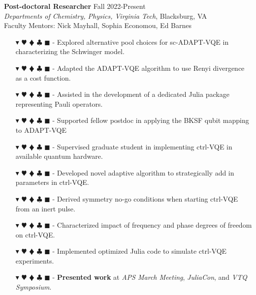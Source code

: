 \documentclass[overlapped, 10pt]{res} %
\newcommand{\physics}{$\blacktriangledown$}
\newcommand{\biochem}{$\varheartsuit$}
\newcommand{\shannon}{$\vardiamondsuit$}
\newcommand{\classic}{$\clubsuit$}
\newcommand{\quantum}{$\blacksquare$}
\newcommand{\physicscolor}{\color{YellowOrange}}
\newcommand{\biochemcolor}{\color{Emerald}}
\newcommand{\shannoncolor}{\color{Goldenrod}}
\newcommand{\classiccolor}{\color{Cyan}}
\newcommand{\quantumcolor}{\color{RedOrange}}
\newcommand{\tag}[1]{
    {\IfSubStr{#1}{\physics}{\physicscolor}{\color{White}}\physics}
    {\IfSubStr{#1}{\biochem}{\biochemcolor}{\color{White}}\biochem}
    {\IfSubStr{#1}{\shannon}{\shannoncolor}{\color{White}}\shannon}
    {\IfSubStr{#1}{\classic}{\classiccolor}{\color{White}}\classic}
    {\IfSubStr{#1}{\quantum}{\quantumcolor}{\color{White}}\quantum}
}
\begin{document}
\begin{resume}
\textbf{Post-doctoral Researcher} \hfill Fall 2022-Present \\
\textit{Departments of Chemistry, Physics, Virginia Tech}, Blacksburg, VA \\
Faculty Mentors: Nick Mayhall, Sophia Economou, Ed Barnes
\begin{itemize} \itemsep -2pt %
\item[\tag{\physics\biochem\quantum}-] Explored alternative pool choices for sc-ADAPT-VQE in characterizing the Schwinger model.
\item[\tag{\physics\biochem\shannon\quantum}-] Adapted the ADAPT-VQE algorithm to use Renyi divergence as a cost function.
\item[\tag{\physics\biochem\classic\quantum}-] Assisted in the development of a dedicated Julia package representing Pauli operators.
\item[\tag{\physics\biochem\shannon\quantum}-] Supported fellow postdoc in applying the BKSF qubit mapping to ADAPT-VQE
\item[\tag{\physics\biochem\quantum}-] Supervised graduate student in implementing ctrl-VQE in available quantum hardware.
\item[\tag{\physics\biochem\quantum}-] Developed novel adaptive algorithm to strategically add in parameters in ctrl-VQE.
\item[\tag{\physics\biochem\quantum}-] Derived symmetry no-go conditions when starting ctrl-VQE from an inert pulse.
\item[\tag{\physics\biochem\classic\quantum}-] Characterized impact of frequency and phase degrees of freedom on ctrl-VQE.
\item[\tag{\physics\biochem\classic\quantum}-] Implemented optimized Julia code to simulate ctrl-VQE experiments.
\item[\tag{}-] \textbf{Presented work} at \textit{APS March Meeting}, \textit{JuliaCon}, and \textit{VTQ Symposium}.
\end{itemize}


\end{resume}
\end{document}
